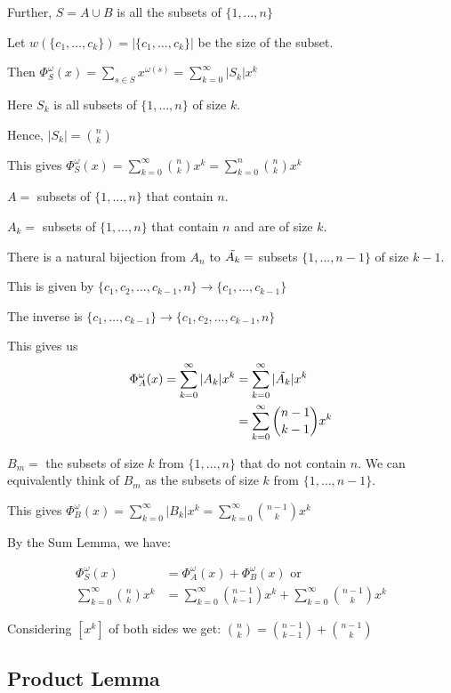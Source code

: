 \documentclass{article}
\begin{document}
Further, $S=A \cup B$ is all the subsets of $\{1,\ldots,n\}$

Let $w(\{c_1,\ldots,c_k\}) = |\{c_1,\ldots,c_k\}|$ be the size of the subset.

Then $\Phi_S^{\omega}(x) = \sum_{s \in S} x^{\omega(s)} = \sum_{k=0}^{\infty} |S_k|x^k$

Here $S_k$ is all subsets of $\{1,\ldots,n\}$ of size $k$.

Hence, $|S_k|=\binom{n}{k}$

This gives $\Phi_{S}^{\omega}(x) = \sum_{k=0}^{\infty}\binom{n}{k}x^k = \sum_{k=0}^{n}\binom{n}{k}x^k$


$A =$ subsets of $\{1,\ldots,n\}$ that contain $n$. 

$A_k =$ subsets of $\{1,\ldots,n\}$ that contain $n$ and are of size $k$. 

There is a natural bijection from $A_n$ to $\Tilde{A_k} =$ subsets $\{1,\ldots,n-1\}$ of size $k-1$.


This is given by $\{c_1,c_2,\ldots,c_{k-1},n\} \to \{c_1,\ldots,c_{k-1}\}$

The inverse is $\{c_1,\ldots,c_{k-1}\} \to \{c_1,c_2,\ldots,c_{k-1},n\}$

This gives us 
\begin{align*}
\Phi_A^{\omega}(x) = \sum_{k=0}^{\infty}|A_k|x^k &= \sum_{k=0}^{\infty}|\Tilde{A_k}|x^k \\
&= \sum_{k=0}^{\infty}\binom{n-1}{k-1}x^k
\end{align*}

$B_m = $ the subsets of size $k$ from $\{1,\ldots,n\}$ that do not contain $n$. We can equivalently think of $B_m$ as the subsets of size $k$ from $\{1,\ldots,n-1\}$. 

This gives $\Phi_B^{\omega}(x) = \sum_{k=0}^{\infty}|B_k|x^k = \sum_{k=0}^{\infty}\binom{n-1}{k}x^k$

By the Sum Lemma, we have:

\begin{align*}
\Phi_S^{\omega}(x) &= \Phi_A^{\omega}(x) + \Phi_B^{\omega}(x) \text{ or} \\
\sum_{k=0}^{\infty}\binom{n}{k}x^k &= \sum_{k=0}^{\infty}\binom{n-1}{k-1}x^k + \sum_{k=0}^{\infty}\binom{n-1}{k}x^k
\end{align*}

Considering $[x^k]$ of both sides we get: $\binom{n}{k} = \binom{n-1}{k-1} + \binom{n-1}{k}$

\subsection{Product Lemma}
\end{document}
